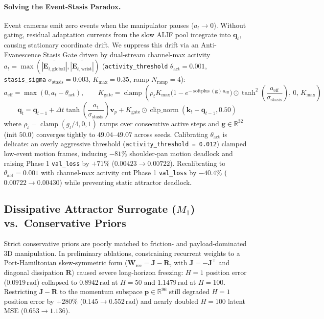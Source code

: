 \documentclass[11pt]{article}
\begin{document}
\paragraph{Solving the Event-Stasis Paradox.} Event cameras emit zero events when the manipulator pauses ($a_t \to 0$). Without gating, residual adaptation currents from the slow ALIF pool integrate into $\mathbf{q}_t$, causing stationary coordinate drift. We suppress this drift via an Anti-Evanescence Stasis Gate driven by dual-stream channel-max activity $a_t = \max(\overline{|\mathbf{E}_{t,\text{global}}|}, \overline{|\mathbf{E}_{t,\text{wrist}}|})$ (\texttt{activity\_threshold} $\theta_{\text{act}} = 0.001$, \texttt{stasis\_sigma} $\sigma_{\text{stasis}} = 0.003$, $K_{\max} = 0.35$, ramp $N_{\text{ramp}} = 4$):
\[
a_{\text{eff}} = \max(0, a_t - \theta_{\text{act}}), \qquad K_{\text{gate}} = \operatorname{clamp}\!\left(\rho_t K_{\max}\big(1 - e^{-\operatorname{softplus}(\mathbf{g})\,a_{\text{eff}}}\big)\odot\tanh^2\!\left(\frac{a_{\text{eff}}}{\sigma_{\text{stasis}}}\right),\, 0,\, K_{\max}\right)
\]
\[
\mathbf{q}_t = \mathbf{q}_{t-1} + \Delta t\tanh\!\left(\frac{a_t}{\sigma_{\text{stasis}}}\right)\mathbf{v}_p + K_{\text{gate}}\odot\operatorname{clip\_norm}(\mathbf{k}_t - \mathbf{q}_{t-1}, 0.50)
\]
where $\rho_t = \operatorname{clamp}(g_t / 4, 0, 1)$ ramps over consecutive active steps and $\mathbf{g} \in \mathbb{R}^{32}$ (init $50.0$) converges tightly to $49.04\text{--}49.07$ across seeds. Calibrating $\theta_{\text{act}}$ is delicate: an overly aggressive threshold (\texttt{activity\_threshold = 0.012}) clamped low-event motion frames, inducing $-81\%$ shoulder-pan motion deadlock and raising Phase 1 \texttt{val\_loss} by $+71\%$ ($0.00423 \to 0.00722$). Recalibrating to $\theta_{\text{act}} = 0.001$ with channel-max activity cut Phase 1 \texttt{val\_loss} by $-40.4\%$ ($0.00722 \to 0.00430$) while preventing static attractor deadlock.

\subsection{Dissipative Attractor Surrogate ($M_1$) vs.\ Conservative Priors}

Strict conservative priors are poorly matched to friction- and payload-dominated 3D manipulation. In preliminary ablations, constraining recurrent weights to a Port-Hamiltonian skew-symmetric form ($\mathbf{W}_{\text{rec}} = \mathbf{J} - \mathbf{R}$, with $\mathbf{J} = -\mathbf{J}^\top$ and diagonal dissipation $\mathbf{R}$) caused severe long-horizon freezing: $H=1$ position error ($0.0919\,\text{rad}$) collapsed to $0.8942\,\text{rad}$ at $H=50$ and $1.1479\,\text{rad}$ at $H=100$. Restricting $\mathbf{J} - \mathbf{R}$ to the momentum subspace $\mathbf{p} \in \mathbb{R}^{96}$ still degraded $H=1$ position error by $+280\%$ ($0.145 \to 0.552\,\text{rad}$) and nearly doubled $H=100$ latent MSE ($0.653 \to 1.136$).
\end{document}
